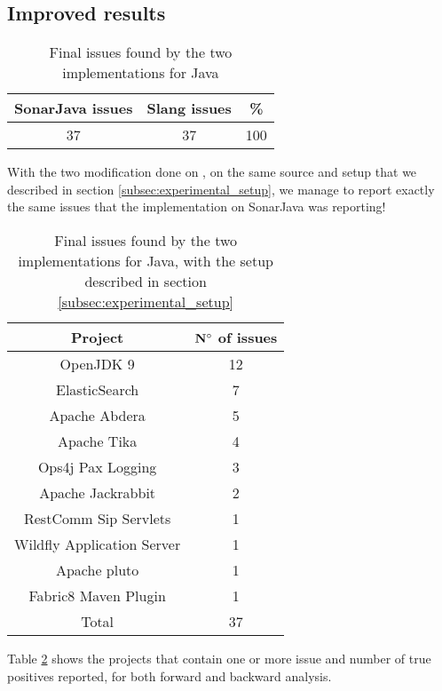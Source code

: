 \subsection{Improved results}
\label{subsec:improved_results}

\begin{table}[h]
	\centering
	\caption{Final issues found by the two implementations for Java}
	\label{table:final-sonarjava-vs-slang}
	\begin{tabular}{|c|c|c|}
		\hline
		\bf SonarJava issues & \bf Slang issues & \bf \% \\ \hline
		37 &  37 &  100 \\ \hline
	\end{tabular}
\end{table}

With the two modification done on \slang{}, on the same source and setup that we described in section \ref{subsec:experimental_setup}, we manage to report exactly the same issues that the implementation on SonarJava was reporting!

\begin{table}[h]
	\centering
	\caption{Final issues found by the two implementations for Java, with the setup described in section \ref{subsec:experimental_setup}}
	\label{table:issues-per-project}
	\begin{tabular}{|c|c|}
		\hline
		\bf Project & \bf $\bf N^{\circ}$  of issues\\ \hline
		OpenJDK 9 & 12 \\
		ElasticSearch & 7 \\
		Apache Abdera & 5 \\
		Apache Tika & 	4 \\
		Ops4j Pax Logging & 3 \\
		Apache Jackrabbit & 2 \\
		RestComm Sip Servlets & 1 \\
		Wildfly Application Server & 1 \\
		Apache pluto & 1 \\
		Fabric8 Maven Plugin & 1 \\\hline
		Total &  37 \\ \hline
	\end{tabular}
\end{table}


Table \ref{table:issues-per-project} shows the projects that contain one or more issue and number of true positives reported, for both forward and backward analysis. 

